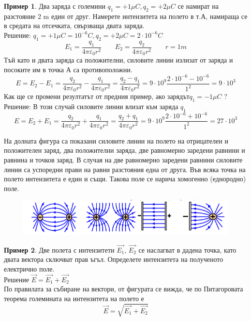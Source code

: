 \documentclass[fleqn, 12pt]{article}
\theoremstyle{definition}
\newtheorem{example}{Пример}[subsection]
\begin{document}
\begin{example}
Два заряда с големини $q_1 = +1 \mu C, q_2 = +2 \mu C$ се намират на разстояние
2 m един от друг. Намерете интензитета на полето в т.А, намираща се в средата на
отсечката, свързваща двата заряда.\\
Решение: $q_1 = +1 \mu C = 10^{-6} C, q_2 = +2 \mu C = 2 \cdot 10^{-6} C$\\
$$E_1 = \frac{q_1}{4 \pi \varepsilon_0 r^2} \qquad E_2 = \frac{q_2}{4 \pi \varepsilon_0 r^2} \qquad r = 1m $$
Тъй като и двата заряда са положителни, силовите линии излизат от заряда и посоките им в точка А са противоположни. 
$$E = E_2 - E_1 = \frac{q_2}{4 \pi \varepsilon_0 r^2} - \frac{q_1}{4 \pi \varepsilon_0 r^2} = \frac{q_2 - q_1}{4 \pi \varepsilon_0 r^2} = 9 \cdot 10^9 \frac{2 \cdot 10^{-6} - 10^{-6}}{1^2} = 9 \cdot 10^3$$
Как ще се промени резултатът от предния пример, ако зарядът$q_1 = -1 \mu C$ ?\\
Решение: В този случай силовите линии влизат към заряда $q_1$
$$E = E_2 + E_1 = \frac{q_2}{4 \pi \varepsilon_0 r^2} + \frac{q_1}{4 \pi \varepsilon_0 r^2} = \frac{q_2 + q_1}{4 \pi \varepsilon_0 r^2} = 9 \cdot 10^9 \frac{2 \cdot 10^{-6} + 10^{-6}}{1^2} = 27 \cdot 10^3$$
\end{example}
На долната фигура са показани силовите линии на полето на отрицателен и
положителен заряд, два положителни заряда, две равномерно заредени равнини и
равнина и точков заряд. В случая на две равномерно заредени равнини силовите линии
са успоредни прави на равни разстояния една от друга. Във всяка точка на полето
интензитета е един и същи. Такова поле се нарича хомогенно (еднородно) поле. 

\begin{figure}[htp!]
  \includegraphics{Pics/physics/lec6-3-1.png}
\end{figure}

\begin{example}
Две полета с интензитети $\vec{E_1}, \, \vec{E_2}$ се
наслагват в дадена точка, като двата вектора сключват
прав ъгъл. Определете интензитета на полученото
електрично поле. \\
Решение $\vec{E} = \vec{E_1} + \vec{E_2}$ \\
По правилата за събиране на вектори, от фигурата се
вижда, че по Питагоровата теорема големината на
интензитета на полето е 
$$\vec{E} = \sqrt{\vec{E_1} + \vec{E_2}}$$
\end{example}
\end{document}
